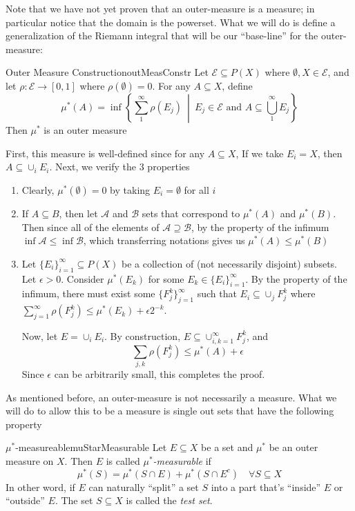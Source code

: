 \documentclass[oneside]{book}
\newcommand{\CA}{\mathcal{A}}
\newcommand{\CB}{\mathcal{B}}
\newcommand{\CE}{\mathcal{E}}
\newcommand{\sse}{\subseteq}
\newcommand{\set}[2]{\left\{#1 \ \middle|\ #2\right\}}
\newcommand{\rw}{\rightarrow}
\begin{document}
Note that we have not yet proven that an outer-measure is a measure; in particular notice that the domain is the
powerset. What we will do is define a generalization of the Riemann integral that will be our ``base-line'' for the
outer-measure:
\begin{prop}{Outer Measure Construction}{outMeasConstr}
	Let $\CE \sse P(X)$ where $\emptyset, X \in \CE$, and let $\rho: \CE \rw [0,1]$ where $\rho(\emptyset) = 0$. For any
	$A \sse X$, define
	\[
		\mu^*(A) = \inf\set{\sum_{1}^\infty \rho(E_j)}{E_j \in \CE\text{ and } A \sse \bigcup_{1}^\infty E_j}
	\]
	Then $\mu^*$ is an outer measure
\end{prop}

\begin{Proof}
	First, this measure is well-defined since for any $A \sse X$, If we take $E_i = X$, then $A \sse \cup_i E_i$. Next,
	we verify the 3 properties
	\begin{enumerate}
		\item Clearly, $\mu^*(\emptyset) = 0$ by taking $E_i = \emptyset$ for all $i$
		\item If $A \sse B$, then let $\CA$ and $\CB$ sets that correspond to $\mu^*(A)$ and $\mu^*(B)$. Then since all
			of the elements of $\CA \supseteq \CB$, by the property of the infimum $\inf \CA \le \inf \CB$, which
			transferring notations gives us $\mu^*(A) \le \mu^*(B)$
		\item Let $\{E_i\}_{i=1}^\infty \sse P(X)$ be a collection of (not necessarily disjoint) subsets. Let $\epsilon
			> 0$. Consider $\mu^*(E_k)$ for some $E_k \in \{E_i\}_{i=1}^\infty$. By the property of the infimum, there
			must exist some $\{F_j^k\}_{j=1}^\infty$ such that $E_i \sse \cup_j F_j^k$ where $\sum_{j=1}^\infty
			\rho(F_j^k) \le \mu^*(E_k) + \epsilon 2^{-k}$. 

			Now, let $E = \cup_i E_i$. By construction, $E \sse \cup_{i,k = 1}^\infty F_j^k$, and 
			\[
				\sum_{j,k} \rho(F_j^k) \le \mu^*(A) + \epsilon
			\]
			Since $\epsilon$ can be arbitrarily small, this completes the proof. 
	\end{enumerate}
\end{Proof}

As mentioned before, an outer-measure is not necessarily a measure. What we will do to allow this to be a measure is
single out sets that have the following property

\begin{defn}{$\mu^*$-measureable}{muStarMeasurable}
	Let $E \sse X$ be a set and $\mu^*$ be an outer measure on $X$. Then $E$ is called \emph{$\mu^*$-measurable} if 
	\[
		\mu^*(S) = \mu^*(S\cap E) + \mu^*(S\cap E^c) \quad \forall S \sse X
	\]
	In other word, if $E$ can naturally ``split'' a set $S$ into a part that's ``inside'' $E$ or ``outside'' $E$. The
	set $S \sse X$ is called the \emph{test set}. 
\end{defn}
\end{document}
